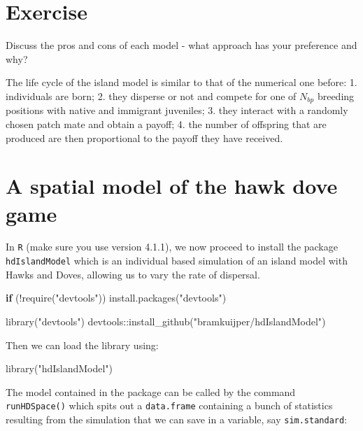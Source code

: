 \documentclass[
]{book}
\newenvironment{Shaded}{\begin{snugshade}}{\end{snugshade}}
\newcommand{\ControlFlowTok}[1]{\textcolor[rgb]{0.13,0.29,0.53}{\textbf{#1}}}
\newcommand{\FunctionTok}[1]{\textcolor[rgb]{0.00,0.00,0.00}{#1}}
\newcommand{\NormalTok}[1]{#1}
\newcommand{\SpecialCharTok}[1]{\textcolor[rgb]{0.00,0.00,0.00}{#1}}
\newcommand{\StringTok}[1]{\textcolor[rgb]{0.31,0.60,0.02}{#1}}
\begin{document}
\hypertarget{exercise-12}{%
\section{Exercise}\label{exercise-12}}

Discuss the pros and cons of each model - what approach has your preference and why?

The life cycle of the island model is similar to that of the numerical one before: 1. individuals are born; 2. they disperse or not and compete for one of \(N_{bp}\) breeding positions with native and immigrant juveniles; 3. they interact with a randomly chosen patch mate and obtain a payoff; 4. the number of offspring that are produced are then proportional to the payoff they have received.

\hypertarget{a-spatial-model-of-the-hawk-dove-game}{%
\section{A spatial model of the hawk dove game}\label{a-spatial-model-of-the-hawk-dove-game}}

In \texttt{R} (make sure you use version 4.1.1), we now proceed to install the package \texttt{hdIslandModel} which is an individual based simulation of an island model with Hawks and Doves, allowing us to vary the rate of dispersal.

\begin{Shaded}
\begin{Highlighting}[]
\ControlFlowTok{if}\NormalTok{ (}\SpecialCharTok{!}\FunctionTok{require}\NormalTok{(}\StringTok{"devtools"}\NormalTok{)) }\FunctionTok{install.packages}\NormalTok{(}\StringTok{"devtools"}\NormalTok{)}

\FunctionTok{library}\NormalTok{(}\StringTok{"devtools"}\NormalTok{)}
\NormalTok{devtools}\SpecialCharTok{::}\FunctionTok{install\_github}\NormalTok{(}\StringTok{"bramkuijper/hdIslandModel"}\NormalTok{)}
\end{Highlighting}
\end{Shaded}

Then we can load the library using:

\begin{Shaded}
\begin{Highlighting}[]
\FunctionTok{library}\NormalTok{(}\StringTok{"hdIslandModel"}\NormalTok{)}
\end{Highlighting}
\end{Shaded}

The model contained in the package can be called by the command \texttt{runHDSpace()} which spits out a \texttt{data.frame} containing a bunch of statistics resulting from the simulation that we can save in a variable, say \texttt{sim.standard}:
\end{document}
